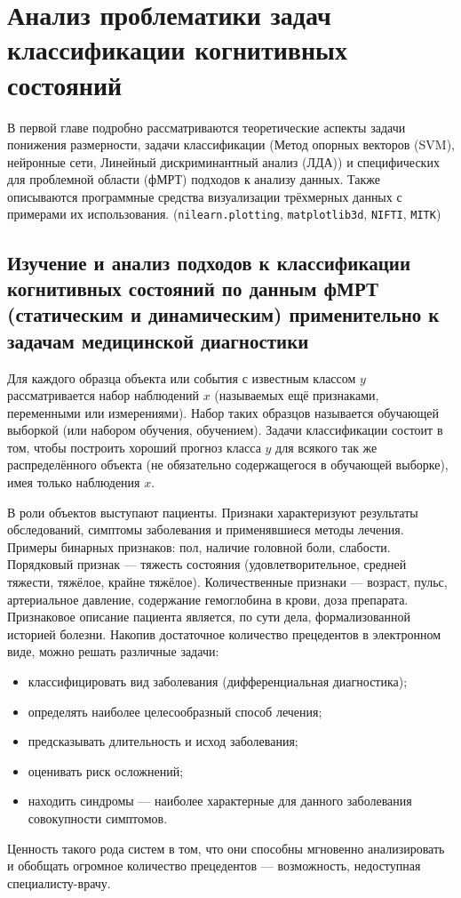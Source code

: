 \chapter{Анализ проблематики задач классификации когнитивных состояний}
\label{chapter1}
\begin{annotation}
	В первой главе подробно рассматриваются теоретические аспекты задачи понижения размерности, задачи классификации (Метод опорных векторов (SVM), нейронные сети, Линейный дискриминантный анализ (ЛДА)) и специфических для проблемной области (фМРТ) подходов к анализу данных. Также описываются программные средства визуализации трёхмерных данных с примерами их использования. (\verb|nilearn.plotting|\cite{10.3389/fninf.2014.00014}, \verb|matplotlib3d|\cite{Hunter:2007}, \verb|NIFTI|, \verb|MITK|\cite{wolf2004medical})
\end{annotation}

\section{Изучение и анализ подходов к классификации когнитивных состояний по данным фМРТ (статическим и динамическим) применительно к задачам медицинской диагностики}
\begin{annotation}
	Для каждого образца объекта или события с известным классом $y$ рассматривается набор наблюдений $x$ (называемых ещё признаками, переменными или измерениями). Набор таких образцов называется обучающей выборкой (или набором обучения, обучением). Задачи классификации состоит в том, чтобы построить хороший прогноз класса $y$ для всякого так же распределённого объекта (не обязательно содержащегося в обучающей выборке), имея только наблюдения $x$.	
\end{annotation}	

В роли объектов выступают пациенты. Признаки характеризуют результаты обследований, симптомы заболевания и применявшиеся методы лечения. Примеры бинарных признаков: пол, наличие головной боли, слабости. Порядковый признак — тяжесть состояния (удовлетворительное, средней тяжести, тяжёлое, крайне тяжёлое). Количественные признаки — возраст, пульс, артериальное давление, содержание гемоглобина в крови, доза препарата. Признаковое описание пациента является, по сути дела, формализованной историей болезни. Накопив достаточное количество прецедентов в электронном виде, можно решать различные задачи:
\begin{itemize}
	\item классифицировать вид заболевания (дифференциальная диагностика);
	\item определять наиболее целесообразный способ лечения;
	\item предсказывать длительность и исход заболевания;
	\item оценивать риск осложнений;
	\item находить синдромы — наиболее характерные для данного заболевания совокупности симптомов.	
\end{itemize}
Ценность такого рода систем в том, что они способны мгновенно анализировать и обобщать огромное количество прецедентов — возможность, недоступная специалисту-врачу.


